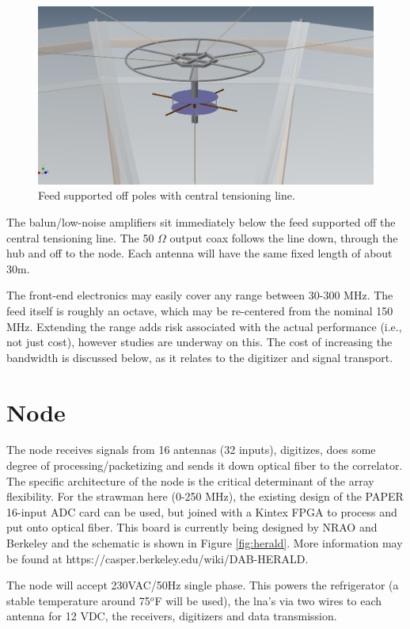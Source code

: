 \documentclass[11pt]{article}
\begin{document}
\begin{figure}[H]
\centering
\includegraphics[width=\textwidth]{plots/frontend.png}
\caption{Feed supported off poles with central tensioning line.}
\label{fig:frontend}
\end{figure}

The balun/low-noise amplifiers sit immediately below the feed supported off the central tensioning line.  The 50 $\Omega$ output coax follows the line down, through the hub and off to the node.  Each antenna will have the same fixed length of about 30m.

The front-end electronics may easily cover any range between 30-300 MHz.  The feed itself is roughly an octave, which may be re-centered from the nominal 150 MHz.   Extending the range adds risk associated with the actual performance (i.e., not just cost), however studies are underway on this.  The cost of increasing the bandwidth is discussed below, as it relates to the digitizer and signal transport.

\section{Node}
The node receives signals from 16 antennas (32 inputs), digitizes, does some degree of processing/packetizing and sends it down optical fiber to the correlator.  The specific architecture of the node is the critical determinant of the array flexibility.  For the strawman here (0-250 MHz), the existing design of the PAPER 16-input ADC card can be used, but joined with a Kintex FPGA to process and put onto optical fiber.   This board is currently being designed by NRAO and Berkeley and the schematic is shown in Figure \ref{fig:herald}.  More information may be found at https://casper.berkeley.edu/wiki/DAB-HERALD.

The node will accept 230VAC/50Hz single phase.  This powers the refrigerator (a stable temperature around 75$^o$F will be used), the lna's via two wires to each antenna for 12 VDC, the receivers, digitizers and data transmission.
\end{document}
